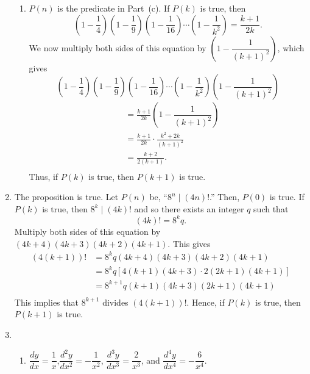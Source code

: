 \begin{enumerate}
\begin{enumerate}
\item $P \left( n \right)$ is the predicate in Part~(c).  If $P \left( k \right)$ is true, then
\[
\left( {1 - \frac{1}{4}} \right)\left( {1 - \frac{1}{9}} \right)\left( {1 - \frac{1}{{16}}} \right) \cdots \left( {1 - \frac{1}{{k^2 }}} \right) = \frac{k+1}{2k}.
\]
We now multiply both sides of this equation by 
$\left( 1 - \dfrac{1}{\left( k+1 \right)^2} \right)$, which gives
\[
\left( {1 - \frac{1}{4}} \right)\left( {1 - \frac{1}{9}} \right)\left( {1 - \frac{1}{{16}}} \right) \cdots \left( {1 - \frac{1}{{k^2 }}} \right) \left( 1 - \dfrac{1}{\left( k+1 \right)^2} \right) 
\]
\[
\begin{aligned}
  \ &= \frac{k+1}{2k} \left( 1 - \dfrac{1}{\left( k+1 \right)^2} \right) \\
  \ &= \frac{k+1}{2k} \cdot \frac{k^2 + 2k}{ \left( k + 1 \right)^2} \\
  \ &= \frac{k + 2}{2 \left( k + 1 \right)}. \\
\end{aligned}
\]
Thus, if $P \left( k \right)$ is true, then $P \left( k +1  \right)$ is true.  
\end{enumerate}



\item The proposition is true.  Let $P \left( n \right)$ be, ``$8^n \mid \left( {4n} \right)!$.''  Then, $P \left( 0 \right)$ is true.  If $P \left( k \right)$ is true, then 
$8^k \mid \left( {4k} \right)!$ and so there exists an integer $q$ such that
\[
\left( 4k \right)! = 8^kq.
\]
Multiply both sides of this equation by 
$\left( 4k + 4\right) \left( 4k + 3 \right) \left( 4k + 2 \right) \left( 4k + 1 \right)$.  This gives
\[
\begin{aligned}
\left( 4 \left( k + 1 \right) \right)! 
  &= 8^kq \left( 4k + 4\right) \left( 4k + 3 \right) \left( 4k + 2 \right) \left( 4k + 1 \right) \\
  &= 8^kq \left[ 4 \left( k + 1 \right) \left( 4k + 3 \right) \cdot 2 \left( 2k + 1 \right) \left( 4k + 1 \right) \right] \\
  &= 8^{k+1} q \left( k + 1 \right) \left( 4k + 3 \right) \left( 2k + 1 \right) \left( 4k + 1 \right) \\
\end{aligned}
\]
This implies that $8^{k+1}$ divides $\left( 4 \left( k + 1 \right) \right)!$. Hence, if 
$P \left( k \right)$ is true, then $P \left( k + 1 \right)$ is true.


\item \begin{enumerate}
\item $\dfrac{{dy}}{{dx}} = \dfrac{1}{x}$,$\dfrac{{d^2 y}}{{dx^2 }} = -\dfrac{1}{x^2}$,
$\dfrac{{d^3 y}}{{dx^3 }} = \dfrac{2}{x^3}$, and $\dfrac{{d^4 y}}{{dx^4 }} = -\dfrac{6}{x^4}$.


\end{enumerate}
\end{enumerate}
